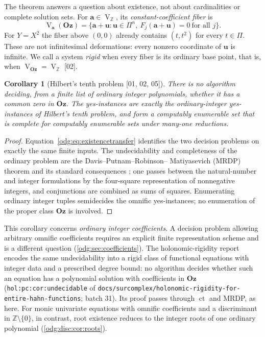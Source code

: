 \documentclass[11pt,oneside]{article}
\numberwithin{equation}{section}
\newtheorem{corollary}[corollary]{Corollary}
\theoremstyle{definition}
\theoremstyle{remark}
\newcommand{\Oz}{\mathbf{Oz}}
\newcommand{\Z}{\mathbb Z}
\newcommand{\ct}{\operatorname{ct}}
\newcommand{\V}{\operatorname V}
\newcommand{\src}[1]{\textup{\textsf{\small[#1]}}}
\newcommand{\replabel}[1]{\nolinkurl{#1}}
\newcommand{\fn}[1]{\nolinkurl{#1}}
\begin{document}
The theorem answers a question about existence, not about cardinalities or
complete solution sets. For $\mathbf a\in\V_\Z$, its
\emph{constant-coefficient fiber} is
\begin{equation}\label{odg:eq:fiber}
 \V_{\mathbf a}(\Oz)=\{\mathbf a+\mathbf u:\mathbf u\in\Pi^n,\
 F_j(\mathbf a+\mathbf u)=0\ \text{for all }j\}.
\end{equation}
For $Y=X^2$ the fiber above $(0,0)$ already contains $(t,t^2)$ for every
$t\in\Pi$. These are not infinitesimal deformations: every nonzero coordinate
of $\mathbf u$ is infinite. We call a system \emph{rigid} when every fiber is
its ordinary base point, that is, when $\V_{\Oz}=\V_\Z$ \src{02}.

\begin{corollary}[Hilbert's tenth problem \src{01, 02, 05}]\label{odg:cor:H10}
There is no algorithm deciding, from a finite list of ordinary integer
polynomials, whether it has a common zero in $\Oz$. The yes-instances are
exactly the ordinary-integer yes-instances of Hilbert's tenth problem, and
form a computably enumerable set that is complete for computably enumerable
sets under many-one reductions.
\end{corollary}
\begin{proof}
Equation~\eqref{odg:eq:existencetransfer} identifies the two decision
problems on exactly the same finite inputs. The undecidability and
completeness of the ordinary problem are the Davis--Putnam--Robinson--%
Matiyasevich (MRDP) theorem and its standard consequences
\cite{Matiyasevich,MatiyasevichBook,Poonen,Scholarpedia}; one passes between
the natural-number and integer formulations by the four-square
representation of nonnegative integers, and conjunctions are combined as sums
of squares. Enumerating ordinary integer tuples semidecides the omnific
yes-instances; no enumeration of the proper class $\Oz$ is involved.
\end{proof}

This corollary concerns \emph{ordinary integer coefficients}. A decision
problem allowing arbitrary omnific coefficients requires an explicit
finite representation scheme and is a different question
(\cref{odg:sec:coefficients}).
The holonomic-rigidity report encodes the same undecidability into a rigid class of
functional equations with integer data and a prescribed degree bound: no algorithm decides
whether such an equation has a polynomial solution with coefficients in $\Oz$
(\replabel{hol:pc:cor:undecidable} of
\fn{docs/surcomplex/holonomic-rigidity-for-entire-hahn-functions}; batch 31). Its proof
passes through $\ct$ and MRDP, as here. For monic univariate equations with omnific
coefficients and a discriminant in $\Z\setminus\{0\}$, in contrast, root existence
reduces to the integer roots of one ordinary polynomial (\cref{odg:disc:cor:roots}).
\end{document}
